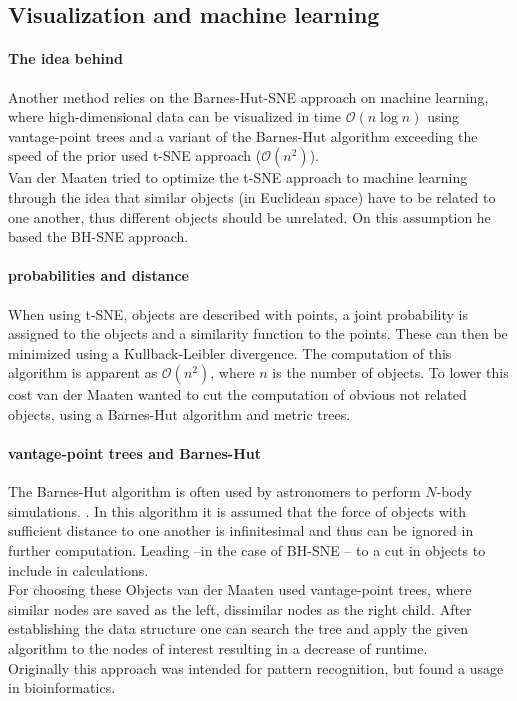 \documentclass[twocolumn]{bmcart}%
\begin{document}
\subsection*{Visualization and machine learning}
\paragraph*{The idea behind}
Another method relies on the Barnes-Hut-SNE\cite{DBLP:journals/corr/abs-1301-3342} approach on machine learning, where high-dimensional data can be visualized in time $\mathcal{O}(n \log n)$ using vantage-point trees and a variant of the Barnes-Hut algorithm exceeding the speed of the prior used t-SNE approach ($\mathcal{O}(n^2)$).\\
Van der Maaten tried to optimize the t-SNE approach to machine learning through the idea that similar objects (in Euclidean space) have to be related to one another, thus different objects should be unrelated. On this assumption he based the BH-SNE approach.
\paragraph*{probabilities and distance}
When using t-SNE, objects are described with points, a joint probability is assigned to the objects and a similarity function to the points. These can then be minimized using a Kullback-Leibler divergence. \cite{DBLP:journals/corr/abs-1301-3342} The computation of this algorithm is apparent as $\mathcal{O}(n^2)$, where $n$ is the number of objects. To lower this cost van der Maaten wanted to cut the computation of obvious not related objects, using a Barnes-Hut algorithm and metric trees.
\paragraph*{vantage-point trees and Barnes-Hut }
 The Barnes-Hut algorithm is often used by astronomers to perform $N$-body simulations.\cite{DBLP:journals/corr/abs-1301-3342} . In this algorithm it is assumed that the force of objects with sufficient distance to one another is infinitesimal and thus can be ignored in further computation. Leading --in the case of BH-SNE -- to a cut in objects to include in calculations.\\
 For choosing these Objects van der Maaten used vantage-point trees, where similar nodes are saved as the left, dissimilar nodes as the right child. After establishing the data structure one can search the tree and apply the given algorithm to the nodes of interest resulting in a decrease of runtime.\\
 Originally this approach was intended for pattern recognition, but found a usage in bioinformatics.
\end{document}
